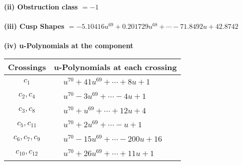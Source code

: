 \documentclass[1p]{elsarticle_modified}
\theoremstyle{definition}
\begin{document}
\flushleft \textbf{(ii) Obstruction class $= -1$}\\~\\
\flushleft \textbf{(iii) Cusp Shapes $= -5.10416 u^{69}+0.201729 u^{68}+\cdots-71.8492 u+42.8742$}\\~\\
\newpage\renewcommand{\arraystretch}{1}
\flushleft \textbf{(iv) u-Polynomials at the component}\newline \\
\begin{tabular}{m{50pt}|m{274pt}}
Crossings & \hspace{64pt}u-Polynomials at each crossing \\
\hline $$\begin{aligned}c_{1}\end{aligned}$$&$\begin{aligned}
&u^{70}+41 u^{69}+\cdots+8 u+1
\end{aligned}$\\
\hline $$\begin{aligned}c_{2},c_{4}\end{aligned}$$&$\begin{aligned}
&u^{70}-3 u^{69}+\cdots-4 u+1
\end{aligned}$\\
\hline $$\begin{aligned}c_{3},c_{8}\end{aligned}$$&$\begin{aligned}
&u^{70}+u^{69}+\cdots+12 u+4
\end{aligned}$\\
\hline $$\begin{aligned}c_{5},c_{11}\end{aligned}$$&$\begin{aligned}
&u^{70}+2 u^{69}+\cdots- u+1
\end{aligned}$\\
\hline $$\begin{aligned}c_{6},c_{7},c_{9}\end{aligned}$$&$\begin{aligned}
&u^{70}-15 u^{69}+\cdots-200 u+16
\end{aligned}$\\
\hline $$\begin{aligned}c_{10},c_{12}\end{aligned}$$&$\begin{aligned}
&u^{70}+26 u^{69}+\cdots+11 u+1
\end{aligned}$\\
\hline
\end{tabular}\\~\\
\end{document}
